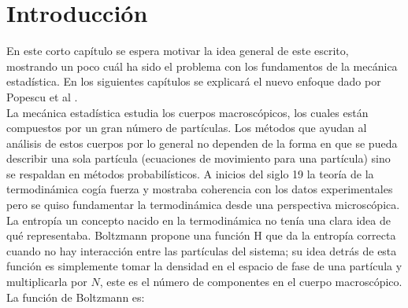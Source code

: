 \chapter{Introducción}
En este corto capítulo se espera motivar la idea general de este escrito, mostrando un poco cuál ha sido el problema con los fundamentos de la mecánica estadística. En los siguientes capítulos se explicará el nuevo enfoque dado por Popescu et al \cite{Popescu2006}.
\\
La mecánica estadística estudia los cuerpos macroscópicos, los cuales están compuestos por un gran número de partículas. Los métodos que ayudan al análisis de estos cuerpos por lo general no dependen de la forma en que se pueda describir una sola partícula (ecuaciones de movimiento para una partícula) sino se respaldan en métodos probabilísticos. A inicios del siglo 19 la teoría de la termodinámica cogía fuerza y mostraba coherencia con los datos experimentales pero se quiso fundamentar la termodinámica desde una perspectiva microscópica. La entropía un concepto nacido en la termodinámica no tenía una clara idea de qué representaba. Boltzmann propone una función H que da la entropía correcta cuando no hay interacción entre las partículas del sistema; su idea detrás de esta función es simplemente tomar la densidad en el espacio de fase de una partícula y multiplicarla por $N$, este es el número de componentes en el cuerpo macroscópico. La función de Boltzmann es:

